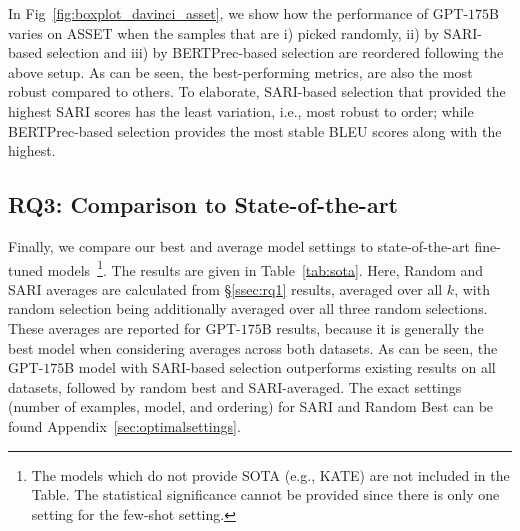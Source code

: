 \documentclass[11pt]{article}
\begin{document}
In Fig~\ref{fig:boxplot_davinci_asset}, we show how the performance of GPT-$175$B varies on ASSET when the samples that are i) picked randomly, ii) by SARI-based selection and iii) by BERTPrec-based selection are reordered following the above setup. As can be seen, the best-performing metrics, are also the most robust compared to others. To elaborate, SARI-based selection that provided the highest SARI scores has the least variation, i.e., most robust to order; while BERTPrec-based selection provides the most stable BLEU scores along with the highest.  




\subsection{RQ3: Comparison to State-of-the-art}
\label{ssec:rq3}
Finally, we compare our best and average model settings to state-of-the-art fine-tuned models~\footnote{The models which do not provide SOTA (e.g., KATE) are not included in the Table. The statistical significance cannot be provided since there is only one setting for the few-shot setting.}. The results are given in Table~\ref{tab:sota}. Here, Random and SARI averages are calculated from \S\ref{ssec:rq1} results, averaged over all $k$, with random selection being additionally averaged over all three random selections. These averages are reported for GPT-$175$B results, because it is generally the best model when considering averages across both datasets. As can be seen, the GPT-$175$B model with SARI-based selection outperforms existing results on all datasets, followed by random best and SARI-averaged. The exact settings (number of examples, model, and ordering) for SARI and Random Best can be found Appendix~\ref{sec:optimalsettings}.
\end{document}
